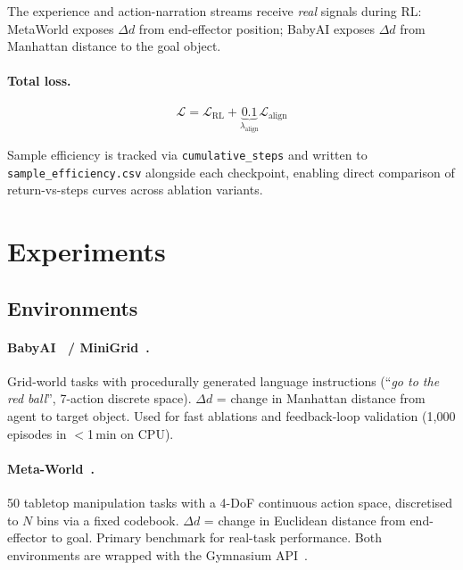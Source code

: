 \documentclass{article}
\begin{document}
The experience and action-narration streams receive \emph{real} signals during RL:
MetaWorld exposes $\Delta d$ from end-effector position; BabyAI exposes
$\Delta d$ from Manhattan distance to the goal object.

\paragraph{Total loss.}
\begin{equation}
  \mathcal{L} = \mathcal{L}_{\mathrm{RL}}
               + \underbrace{0.1}_{\lambda_{\mathrm{align}}}
                 \mathcal{L}_{\mathrm{align}}
  \label{eq:total}
\end{equation}

Sample efficiency is tracked via \texttt{cumulative\_steps} and written
to \texttt{sample\_efficiency.csv} alongside each checkpoint, enabling
direct comparison of return-vs-steps curves across ablation variants.

\section{Experiments}
\label{sec:experiments}

\subsection{Environments}

\paragraph{BabyAI~\citep{chevalier2019babyai} / MiniGrid~\citep{minigrid}.}
Grid-world tasks with procedurally generated language instructions
(``\emph{go to the red ball}'', 7-action discrete space).
$\Delta d$ = change in Manhattan distance from agent to target object.
Used for fast ablations and feedback-loop validation (1{,}000 episodes
in $<$1\,min on CPU).

\paragraph{Meta-World~\citep{yu2020metaworld}.}
50 tabletop manipulation tasks with a 4-DoF continuous action space,
discretised to $N$ bins via a fixed codebook.
$\Delta d$ = change in Euclidean distance from end-effector to goal.
Primary benchmark for real-task performance.
Both environments are wrapped with the Gymnasium
API~\citep{gymnasium}.
\end{document}
